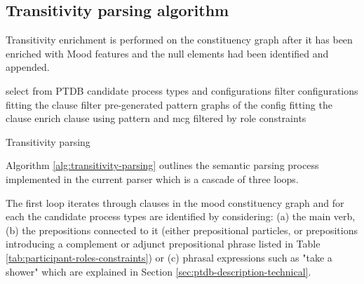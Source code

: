 \subsection{Transitivity parsing algorithm}
Transitivity enrichment is performed on the constituency graph after it has been enriched with Mood features and the null elements had been identified and appended. 


\begin{algorithm}[H]
	\Input { \cg, \dg }
	\Begin
	{
		{
			select from PTDB candidate process types and configurations\;
			filter configurations fitting the clause \;
			{
				filter pre-generated pattern graphs of the config fitting the clause\;
				{
					\label{line:enrich-from-pattern} enrich clause using pattern and mcg filtered by role constraints\;
				}
			}
		}
	}
	\caption{Transitivity parsing}
	\label{alg:transitivity-parsing}
\end{algorithm}

Algorithm \ref{alg:transitivity-parsing} outlines the semantic parsing process implemented in the current parser which is a cascade of three loops. 

The first loop iterates through clauses in the mood constituency graph and for each the candidate process types are identified by considering: (a) the main verb, (b) the prepositions connected to it (either prepositional particles, or prepositions introducing a complement or adjunct prepositional phrase listed in Table \ref{tab:participant-roles-constraints}) or (c) phrasal expressions such as "take a shower" which are explained in Section \ref{sec:ptdb-description-technical}.


